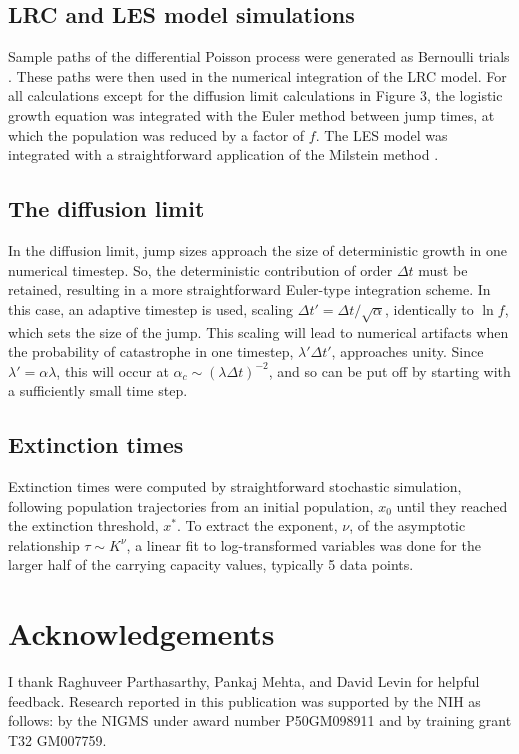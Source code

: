 \subsection{LRC and LES model simulations}Sample paths of the differential Poisson process were generated as Bernoulli trials \cite{hansonBook}.  These paths were then used in the numerical integration of the LRC model.  For all calculations except for the diffusion limit calculations in Figure 3, the logistic growth equation was integrated with the Euler method between jump times, at which the population was reduced by a factor of $f$.  The LES model was integrated with a straightforward application of the Milstein method \cite{mil1975approximate}.

\subsection{The diffusion limit}
In the diffusion limit, jump sizes approach the size of deterministic growth in one numerical timestep.  So, the deterministic contribution of order $\Delta t$ must be retained, resulting in a more straightforward Euler-type integration scheme.  In this case, an adaptive timestep is used, scaling $\Delta t' = \Delta t/\sqrt{\alpha}$, identically to $\ln f$, which sets the size of the jump.  This scaling will lead to numerical artifacts when the probability of catastrophe in one timestep, $\lambda'\Delta t'$, approaches unity.   Since $\lambda' = \alpha \lambda$, this will occur at $\alpha_c \sim (\lambda\Delta t)^{-2}$, and so can be put off by starting with a sufficiently small time step.  

\subsection{Extinction times}
Extinction times were computed by straightforward stochastic simulation, following population trajectories from an initial population, $x_0$ until they reached the extinction threshold, $x^*$.  To extract the exponent, $\nu$, of the asymptotic relationship $\tau \sim K^{\nu}$, a linear fit to log-transformed variables was done for the larger half of the carrying capacity values, typically 5 data points. 
 

\section{Acknowledgements}
I thank Raghuveer Parthasarthy, Pankaj Mehta, and David Levin for helpful feedback.  Research reported in this publication was supported by the NIH as follows: by the NIGMS under award number P50GM098911 and by training grant T32 GM007759.





